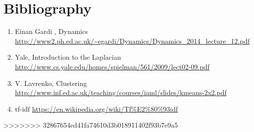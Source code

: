 \documentclass[10pt,twocolumn]{article}
\begin{document}
\section{Bibliography}
\begin{enumerate}
\item Einan Gardi , Dynamics \url{http://www2.ph.ed.ac.uk/~egardi/Dynamics/Dynamics_2014_lecture_12.pdf}
\item  Yale, Introduction to the Laplacian \url{http://www.cs.yale.edu/homes/spielman/561/2009/lect02-09.pdf}
\item V. Lavrenko, Clustering \url{http://www.inf.ed.ac.uk/teaching/courses/iaml/slides/kmeans-2x2.pdf}
\item tf-idf \url{https://en.wikipedia.org/wiki/Tf%E2%80%93idf}
\end{enumerate}
>>>>>>> 32867654ed41fa74610d3b018911402f93b7e9a5
\end{document}
